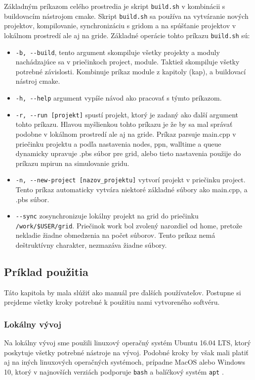 Základným príkazom celého prostredia je skript \texttt{build.sh} v kombinácii s buildovacím nástrojom cmake.
Skript \texttt{build.sh} sa používa na vytváranie nových projektov, kompilovanie,
synchronizáciu s gridom a na spúšťanie projektov v lokálnom prostredí ale aj na gride.
Základné operácie tohto príkazu \texttt{build.sh} sú:
\begin{itemize}
\item
  \texttt{-b, -{}-build}, tento argument skompiluje všetky projekty a moduly nachádzajúce sa v priečinkoch project, module. Taktiež skompiluje
  všetky potrebné závislosti. Kombinuje príkaz module z kapitoly (kap), a buildovací nástroj cmake.
\item
  \texttt{-h, -{}-help} argument vypíše návod ako pracovať s týmto príkazom.
\item
  \texttt{-r, -{}-run [projekt]} spustí projekt, ktorý je zadaný ako ďalší argument tohto príkazu.
  Hlavou myšlienkou tohto príkazu je že by sa mal správať podobne v lokálnom prostredí ale aj na gride.
  Príkaz parsuje main.cpp v priečinku projektu a podľa nastavenia nodes, ppn, walltime a queue dynamicky upravuje .pbs súbor pre grid,
  alebo tieto nastavenia použije do príkazu mpirun na simulovanie gridu.
\item
  \texttt{-n, -{}-new-project [nazov\_projektu]} vytvorí projekt v priečinku project.
  Tento príkaz automaticky vytvára niektoré základné súbory ako main.cpp, a .pbs súbor.
\item
  \texttt{-{}-sync} zosynchronizuje lokálny projekt na grid do priečinku \texttt{/work/\$USER/grid}.
  Priečinok work bol zvolený narozdiel od home, pretože nekladie žiadne obmedzenia na počet súborov.
  Tento príkaz nemá deštruktívny charakter, nezmazáva žiadne súbory.
\end{itemize}

\subsection{Príklad použitia}
Táto kapitola by mala slúžiť ako manuál pre ďalších používateľov.
Postupne si prejdeme všetky kroky potrebné k použitiu nami vytvoreného softvéru.

\subsubsection{Lokálny vývoj}
\label{subsec:local-dev}
Na lokálny vývoj sme použili linuxový operačný systém Ubuntu 16.04 LTS, ktorý poskytuje všetky potrebné nástroje na vývoj.
Podobné kroky by však mali platiť aj na iných linuxových operačných systémoch, prípadne MacOS alebo Windows 10,
ktorý v najnovších verziách podporuje \texttt{bash} a balíčkový systém \texttt{apt} \cite{bash-on-win}.

